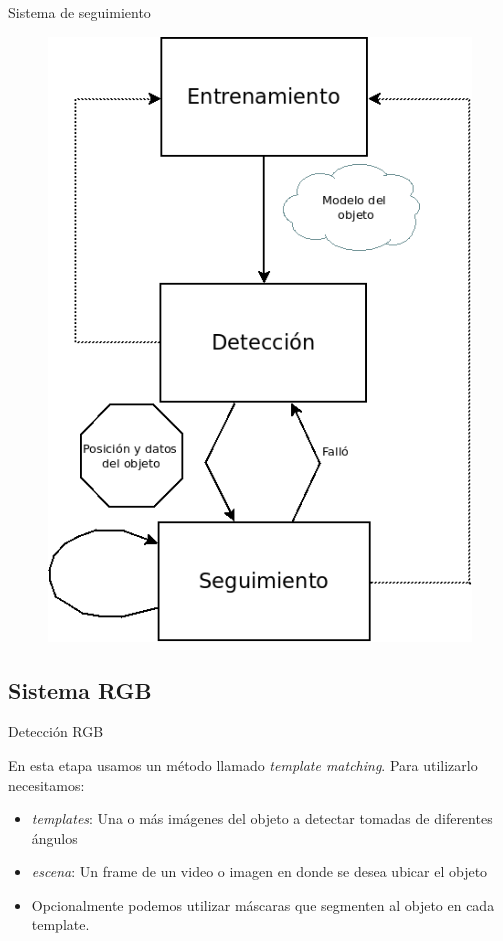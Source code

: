 \documentclass[]{beamer}
\begin{document}
\begin{frame}[t]{Sistema de seguimiento}
    \begin{figure}[t]
        \centering
        \vspace{-13pt}
        \includegraphics[scale=0.3]{img/esquema_seguimiento.png}
    \end{figure}
\end{frame}


\subsection{Sistema RGB}
\begin{frame}[t]{Detección RGB}

    En esta etapa usamos un método llamado \textit{template matching}. Para utilizarlo necesitamos:
    \begin{itemize}
        \item \textit{templates}: Una o más imágenes del objeto a detectar tomadas de diferentes ángulos
        \item \textit{escena}: Un frame de un video o imagen en donde se desea ubicar el objeto
        \item Opcionalmente podemos utilizar máscaras que segmenten al objeto en cada template.
    \end{itemize}
\end{frame}
\end{document}
